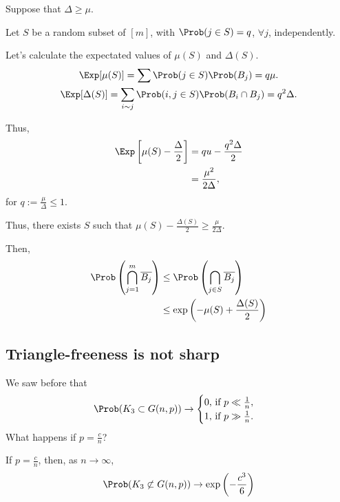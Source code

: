 \begin{dem}
	Suppose that $\Delta \ge \mu$.

	Let $S$ be a random subset of $[m]$, with $\Prob(j \in S) = q$, $\forall j$, independently.

	Let's calculate the expectated values of $\mu(S)$ and $\Delta(S)$.
	\begin{gather*}
		\Exp[\mu(S)] = \sum \Prob(j\in S) \Prob(B_j) = q\mu.\\
		\Exp[\Delta(S)] = \sum_{i \sim j} \Prob(i, j \in S) \Prob(B_i \cap B_j) = q^2\Delta.
	\end{gather*}

	Thus,
	\begin{align*}
		\Exp\left[\mu(S) - \frac{\Delta}{2}\right] &= qu - \frac{q^2\Delta}{2}\\
		&= \frac{\mu^2}{2\Delta},
	\end{align*}
	for $q := \frac{\mu}{\Delta} \le 1$.

	Thus, there exists  $S$ such that $\mu(S) - \frac{\Delta(S)}{2} \ge \frac{\mu}{2\Delta}$.

	Then,
	\begin{align*}
		\Prob\left(\bigcap_{j=1}^m \overline{B_j}\right)
			&\le \Prob\left(\bigcap_{j \in S} \overline{B_j}\right)\\
			&\le \exp\left(-\mu(S) + \frac{\Delta(S)}{2}\right)\\
	\end{align*}
\end{dem}

\subsection{Triangle-freeness is not sharp}

	We saw before that \[
		\Prob(K_3 \subset G(n, p)) \to
		\begin{cases}
			0\text{, if } p \ll \frac{1}{n},\\
			1\text{, if } p \gg \frac{1}{n}.
		\end{cases}
	\]
	What happens if $p = \frac{c}{n}$?
\begin{lem}	
	If $p = \frac{c}{n}$, then, as $n \to \infty$, \[
		\Prob(K_3 \not\subset G(n, p)) \to \exp\left(-\frac{c^3}{6}\right)
	\]	
\end{lem}

